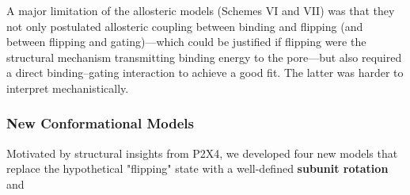 \documentclass[pdflatex,sn-mathphys-num]{sn-jnl}%
\theoremstyle{thmstyleone}%
\theoremstyle{thmstyletwo}%
\theoremstyle{thmstylethree}%
\begin{document}
A major limitation of the allosteric models (Schemes VI and VII) was that they not only postulated allosteric coupling between binding and flipping (and between flipping and gating)—which could be justified if flipping were the structural mechanism transmitting binding energy to the pore—but also required a direct binding–gating interaction to achieve a good fit. The latter was harder to interpret mechanistically.

\subsubsection{New Conformational Models}

Motivated by structural insights from P2X4, we developed four new models that replace the hypothetical "flipping" state with a well-defined \textbf{subunit rotation} and
\end{document}
